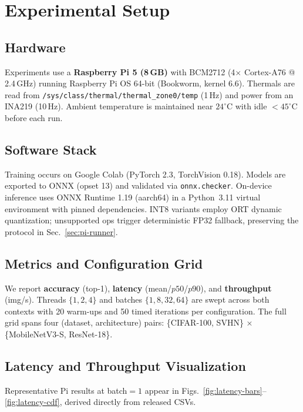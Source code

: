 \documentclass{article}
\begin{document}
\section{Experimental Setup}
\label{sec:exp-setup}

\subsection{Hardware}
Experiments use a \textbf{Raspberry Pi 5 (8\,GB)} with BCM2712 (4$\times$ Cortex-A76 @ 2.4\,GHz) running Raspberry Pi OS 64-bit (Bookworm, kernel 6.6).  
Thermals are read from \texttt{/sys/class/thermal/thermal\_zone0/temp} (1\,Hz) and power from an INA219 (10\,Hz).  
Ambient temperature is maintained near $24^\circ$C with idle $<45^\circ$C before each run.

\subsection{Software Stack}
Training occurs on Google Colab (PyTorch 2.3, TorchVision 0.18).  
Models are exported to ONNX (opset 13) and validated via \texttt{onnx.checker}.  
On-device inference uses ONNX Runtime 1.19 (aarch64) in a Python~3.11 virtual environment with pinned dependencies.  
INT8 variants employ ORT dynamic quantization; unsupported ops trigger deterministic FP32 fallback, preserving the protocol in Sec.~\ref{sec:pi-runner}.

\subsection{Metrics and Configuration Grid}
We report \textbf{accuracy} (top-1), \textbf{latency} (mean/$p50$/$p90$), and \textbf{throughput} (img/s).  
Threads $\{1,2,4\}$ and batches $\{1,8,32,64\}$ are swept across both contexts with 20 warm-ups and 50 timed iterations per configuration.  
The full grid spans four (dataset, architecture) pairs: \{CIFAR-100, SVHN\} × \{MobileNetV3-S, ResNet-18\}.

\subsection{Latency and Throughput Visualization}
Representative Pi results at batch$=1$ appear in Figs.~\ref{fig:latency-bars}–\ref{fig:latency-cdf}, derived directly from released CSVs.
\end{document}
